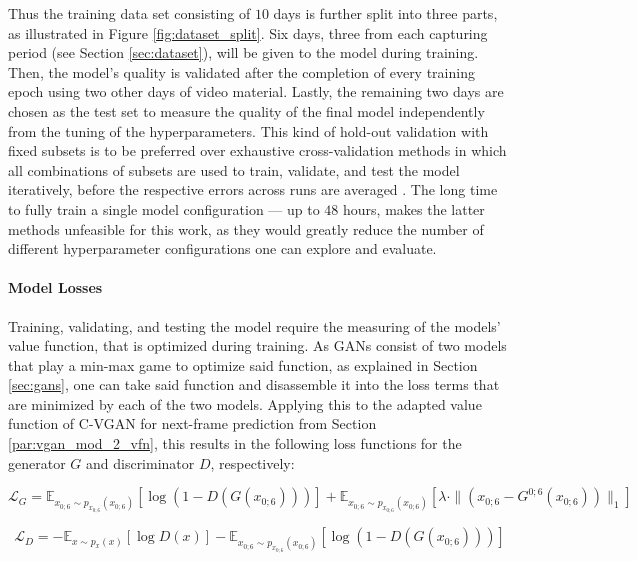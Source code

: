 Thus the training data set consisting of $10$ days is further split into three parts, as illustrated in Figure \ref{fig:dataset_split}. Six days, three from each capturing period (see Section \ref{sec:dataset}), will be given to the model during training. Then, the model's quality is validated after the completion of every training epoch using two other days of video material. Lastly, the remaining two days are chosen as the test set to measure the quality of the final model independently from the tuning of the hyperparameters. This kind of hold-out validation with fixed subsets is to be preferred over exhaustive cross-validation methods in which all combinations of subsets are used to train, validate, and test the model iteratively, before the respective errors across runs are averaged \cite{stone1974cross}. The long time to fully train a single model configuration --- up to $48$ hours, makes the latter methods unfeasible for this work, as they would greatly reduce the number of different hyperparameter configurations one can explore and evaluate. 

\paragraph{Model Losses}
Training, validating, and testing the model require the measuring of the models' value function, that is optimized during training. As GANs consist of two models that play a min-max game to optimize said function, as explained in Section \ref{sec:gans}, one can take said function and disassemble it into the loss terms that are minimized by each of the two models. Applying this to the adapted value function of C-VGAN for next-frame prediction from Section \ref{par:vgan_mod_2_vfn}, this results in the following loss functions for the generator $G$ and discriminator $D$, respectively:

\begin{equation} \label{eq:loss_g}
\mathcal{L}_G = \mathbb{E}_{x_{0;6} \sim p_{x_{0;6}}(x_{0;6})}[\log(1 - D(G(x_{0;6})))] + \mathbb{E}_{x_{0;6} \sim p_{x_{0;6}}(x_{0;6})}[\lambda \cdot \|(x_{0;6} - G^{0;6}(x_{0;6}))\|_1]
\end{equation}

\begin{equation} \label{eq:loss_d}
\mathcal{L}_D = - \mathbb{E}_{x \sim p_x(x)}[\log D(x)] - \mathbb{E}_{x_{0;6} \sim p_{x_{0;6}}(x_{0;6})}[\log(1 - D(G(x_{0;6})))]
\end{equation}

